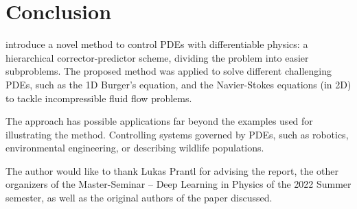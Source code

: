 \documentclass[acmtog]{techreportacmart}
\begin{document}
\section{Conclusion}

\cite{ControlPDEs} introduce a novel method to control PDEs with differentiable
physics: a hierarchical corrector-predictor scheme, dividing the problem into
easier subproblems. The proposed method was applied to solve different
challenging PDEs, such as the 1D Burger's equation, and the Navier-Stokes
equations (in 2D) to tackle incompressible fluid flow problems.

The approach has possible applications far beyond the examples used for
illustrating the method. Controlling systems governed by PDEs, such as robotics,
environmental engineering, or describing wildlife populations.

\begin{acks}

  The author would like to thank Lukas Prantl for advising the report, the other
  organizers of the Master-Seminar -- Deep Learning in Physics of the 2022
  Summer semester, as well as the original authors of the paper discussed.

\end{acks}



\end{document}
